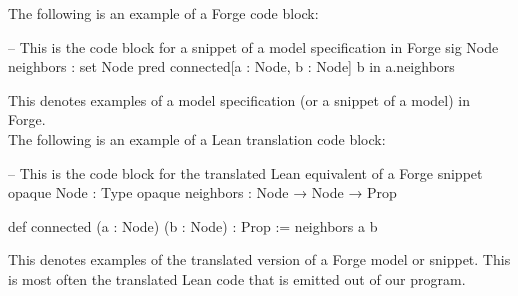 \noindent The following is an example of a Forge code block: 
\begin{forge}
-- This is the code block for a snippet of a model specification in Forge
sig Node {
  neighbors : set Node
}
pred connected[a : Node, b : Node] {
  b in a.neighbors
}
\end{forge}
This denotes examples of a model specification (or a snippet of a model) in Forge. \\

\noindent The following is an example of a Lean translation code block:
\begin{lean}
-- This is the code block for the translated Lean equivalent of a Forge snippet
opaque Node : Type
opaque neighbors : Node → Node → Prop

def connected (a : Node) (b : Node) : Prop :=
  neighbors a b
\end{lean}
This denotes examples of the translated version of a Forge model or snippet. This is most often the translated Lean code that is emitted out of our program. 